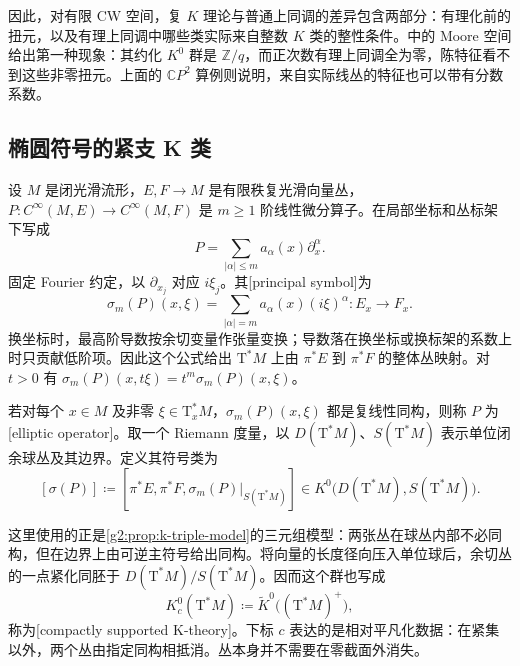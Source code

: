 因此，对有限 CW 空间，复 \(K\) 理论与普通上同调的差异包含两部分：有理化前的扭元，以及有理上同调中哪些类实际来自整数 \(K\) 类的整性条件。中的 Moore 空间给出第一种现象：其约化 \(K^0\) 群是 \(\mathbb Z/q\)，而正次数有理上同调全为零，陈特征看不到这些非零扭元。上面的 \(\mathbb CP^2\) 算例则说明，来自实际线丛的特征也可以带有分数系数。

\subsection{椭圆符号的紧支 K 类}
\label{g2:subsec:2404:03}
设 \(M\) 是闭光滑流形，\(E,F\to M\) 是有限秩复光滑向量丛，\(P:C^\infty(M,E)\to C^\infty(M,F)\) 是 \(m\ge1\) 阶线性微分算子。在局部坐标和丛标架下写成
\[
	P=\sum_{|\alpha|\le m}a_\alpha(x)\partial_x^\alpha.
\]
固定 Fourier 约定，以 \(\partial_{x_j}\) 对应 \(i\xi_j\)。其[principal symbol]为
\[
	\sigma_m(P)(x,\xi)=\sum_{|\alpha|=m}a_\alpha(x)(i\xi)^\alpha:
	E_x\longrightarrow F_x.
\]
换坐标时，最高阶导数按余切变量作张量变换；导数落在换坐标或换标架的系数上时只贡献低阶项。因此这个公式给出 \(\mathrm T^*M\) 上由 \(\pi^*E\) 到 \(\pi^*F\) 的整体丛映射。对 \(t>0\) 有 \(\sigma_m(P)(x,t\xi)=t^m\sigma_m(P)(x,\xi)\)。

\begin{definition}\label{g2:def:elliptic-symbol-k-class}
	若对每个 \(x\in M\) 及非零 \(\xi\in\mathrm T_x^*M\)，\(\sigma_m(P)(x,\xi)\) 都是复线性同构，则称 \(P\) 为[elliptic operator]。取一个 Riemann 度量，以 \(D(\mathrm T^*M)\)、\(S(\mathrm T^*M)\) 表示单位闭余球丛及其边界。定义其符号类为
	\[
		[\sigma(P)]\coloneqq
		[\pi^*E,\pi^*F,\sigma_m(P)|_{S(\mathrm T^*M)}]
		\in K^0\bigl(D(\mathrm T^*M),S(\mathrm T^*M)\bigr).
	\]
\end{definition}

这里使用的正是\cref{g2:prop:k-triple-model}的三元组模型：两张丛在球丛内部不必同构，但在边界上由可逆主符号给出同构。将向量的长度径向压入单位球后，余切丛的一点紧化同胚于 \(D(\mathrm T^*M)/S(\mathrm T^*M)\)。因而这个群也写成
\[
	K_c^0(\mathrm T^*M)\coloneqq\widetilde K^0\bigl((\mathrm T^*M)^+\bigr),
\]
称为[compactly supported K-theory]。下标 \(c\) 表达的是相对平凡化数据：在紧集以外，两个丛由指定同构相抵消。丛本身并不需要在零截面外消失。

\ProseParagraphBreak

